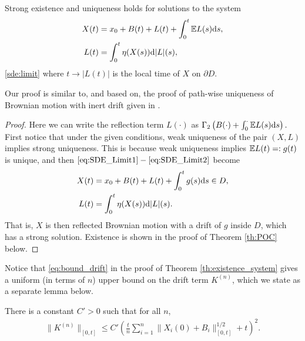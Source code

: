 \begin{proposition}\label{Prop:SDE_EU}
	Strong existence and uniqueness holds for solutions to the system 
	\begin{align}
		X(t) &= x_0 + B(t)  + L(t) + \int_0^t\mathbb{E} L(s)\mathrm{d} s,\label{eq:SDE_Limit1}\\
		L(t) &= \int_0^t \eta(X(s)) \mathrm{d}|L|(s)\label{eq:SDE_Limit2},
	\end{align}\eqref{sde:limit}
	where $t \to |L(t)|$ is the local time of $X$ on $\partial D$.
\end{proposition}
\begin{remark}
	Our proof is similar to, and based on, the proof of path-wise uniqueness of Brownian motion with inert drift given in \cite{bass2010stationary}.
\end{remark}
\begin{proof}
Here we can write the reflection term $L(\cdot)$ as $\Gamma_2\left(B(\cdot) + \int_0^\cdot \mathbb{E} L(s) \mathrm{d} s\right).$ First notice that under the given conditions, weak uniqueness of the pair $(X, L)$ implies strong uniqueness. This is because weak uniqueness implies $\mathbb{E} L(t) =: g(t)$ is unique, and then $\eqref{eq:SDE_Limit1}-\eqref{eq:SDE_Limit2}$ become 
	\begin{align}
		X(t) &= x_0 + B(t)  + L(t) + \int_0^tg(s)\mathrm{d} s \in D,\\
		L(t) &= \int_0^t \eta(X(s)) \mathrm{d}|L|(s).
	\end{align}
	That is, $X$ is then reflected Brownian motion with a drift of $g$ inside $D$, which has a strong solution.
Existence is shown in the proof of Theorem \ref{th:POC} below.
\end{proof}

\noindent
Notice that \eqref{eq:bound_drift} in the proof of Theorem \ref{th:existence_system} gives a uniform (in terms of $n$) upper bound on the drift term $K^{(n)}$, which we state as a separate lemma below.

\begin{lemma}\label{lemma:uniform_bound}
	There is a constant $C' > 0$ such that for all $n$, 
	\begin{align}\label{eq:lemma_bound_drift}
		\|K^{(n)}\|_{[0, t]} \leq C'\left(\frac{t}{n}\sum_{i = 1}^n\|X_i(0) + B_i\|_{[0, t]}^{1/2} + t\right)^2.
	\end{align}
\end{lemma}


